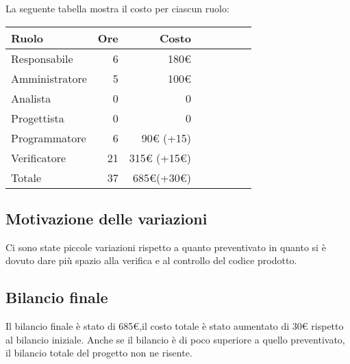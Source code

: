 La seguente tabella mostra il costo per ciascun ruolo:
\begin{table}[ht]
    \begin{tabularx}{\linewidth}{X|rrrrrrr}
    \rowcolor{gray!30}Ruolo & Ore & Costo \\
    \hline
    Responsabile                            & 6    & 180€\\
    \rowcolor{gray!10}Amministratore        & 5    & 100€  \\
    Analista                                & 0    & 0\\
    \rowcolor{gray!10}Progettista           & 0    & 0\\
    Programmatore                           & 6    & 90€ (+15) \\
    \rowcolor{gray!10}Verificatore          & 21   & 315€ (+15€) \\
    \hline Totale                           & 37   & 685€(+30€)\\ 
    \end{tabularx}
\end{table}

\subsection{Motivazione delle variazioni}
Ci sono state piccole variazioni rispetto a quanto preventivato in quanto si è dovuto dare più spazio alla verifica e al controllo del codice prodotto.

\subsection{Bilancio finale}
Il bilancio finale è stato di 685€,il costo totale è stato aumentato di 30€ rispetto al bilancio iniziale. Anche se il bilancio è di poco superiore a quello preventivato, il bilancio totale del progetto non ne risente. 